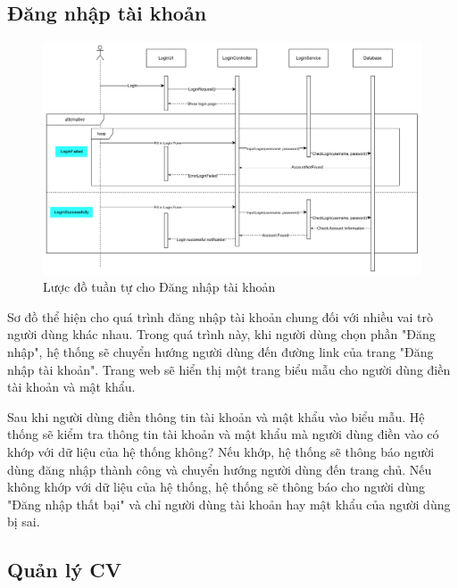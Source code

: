 \subsection{Đăng nhập tài khoản }

\begin{figure}[H]

	\centering
    \includegraphics[scale=0.1]{img/Login_sequenceDiagram.png}
    \caption{Lược đồ tuần tự cho Đăng nhập tài khoản}
	
\end{figure}

Sơ đồ thể hiện cho quá trình đăng nhập tài khoản chung đối với nhiều vai trò người dùng khác nhau. Trong quá trình này, khi người dùng chọn phần "Đăng nhập", hệ thống sẽ chuyển hướng người dùng đến đường link của trang "Đăng nhập tài khoản". Trang web sẽ hiển thị một trang biểu mẫu cho người dùng điền tài khoản và mật khẩu. 

Sau khi người dùng điền thông tin tài khoản và mật khẩu vào biểu mẫu. Hệ thống sẽ kiểm tra thông tin tài khoản và mật khẩu mà người dùng điền vào có khớp với dữ liệu của hệ thống không? Nếu khớp, hệ thống sẽ thông báo người dùng đăng nhập thành công và chuyển hướng người dùng đến trang chủ. Nếu không khớp với dữ liệu của hệ thống, hệ thống sẽ thông báo cho người dùng "Đăng nhập thất bại" và chỉ người dùng tài khoản hay mật khẩu của người dùng bị sai.

\subsection{Quản lý CV}


